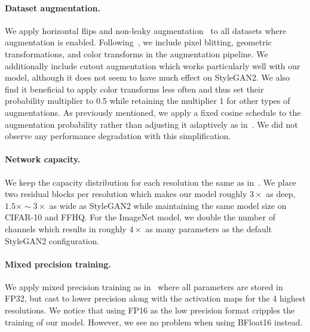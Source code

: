 \vspace{-0.1cm}
\paragraph{Dataset augmentation.}
We apply horizontal flips and non-leaky augmentation~\cite{sg2ada} to all datasets where augmentation is enabled. Following~\cite{sg2ada}, we include pixel blitting, geometric transformations, and color transforms in the augmentation pipeline. We additionally include cutout augmentation which works particularly well with our model, although it does not seem to have much effect on StyleGAN2. We also find it beneficial to apply color transforms less often and thus set their probability multiplier to 0.5 while retaining the multiplier 1 for other types of augmentations. As previously mentioned, we apply a fixed cosine schedule to the augmentation probability rather than adjusting it adaptively as in~\cite{sg2ada}. We did not observe any performance degradation with this simplification.

\vspace{-0.1cm}
\paragraph{Network capacity.}
We keep the capacity distribution for each resolution the same as in~\cite{sg2ada,sg3}. We place two residual blocks per resolution which makes our model roughly $3\times$ as deep, $1.5\times\sim3\times$ as wide as StyleGAN2 while maintaining the same model size on CIFAR-10 and FFHQ. For the ImageNet model, we double the number of channels which results in roughly $4\times$ as many parameters as the default StyleGAN2 configuration.

\vspace{-0.1cm}
\paragraph{Mixed precision training.}
We apply mixed precision training as in~\cite{sg2ada,sg3} where all parameters are stored in FP32, but cast to lower precision along with the activation maps for the 4 highest resolutions. We notice that using FP16 as the low precision format cripples the training of our model. However, we see no problem when using BFloat16 instead.

\vspace{-0.1cm}
